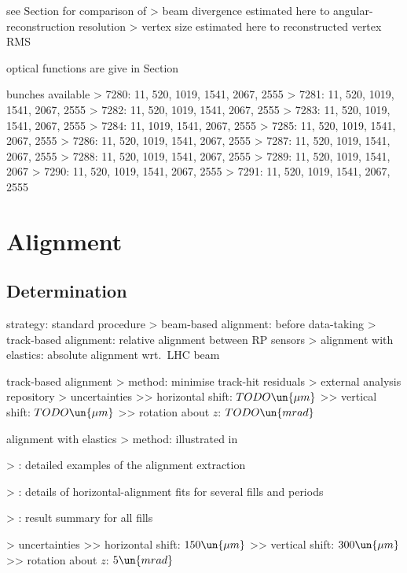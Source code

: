 \> see Section  for comparison of
\>> beam divergence estimated here to angular-reconstruction resolution
\>> vertex size estimated here to reconstructed vertex RMS

\> optical functions are give in Section 

\> bunches available
\>> 7280: 11, 520, 1019, 1541, 2067, 2555
\>> 7281: 11, 520, 1019, 1541, 2067, 2555
\>> 7282: 11, 520, 1019, 1541, 2067, 2555
\>> 7283: 11, 520, 1019, 1541, 2067, 2555
\>> 7284: 11, 1019, 1541, 2067, 2555
\>> 7285: 11, 520, 1019, 1541, 2067, 2555
\>> 7286: 11, 520, 1019, 1541, 2067, 2555
\>> 7287: 11, 520, 1019, 1541, 2067, 2555
\>> 7288: 11, 520, 1019, 1541, 2067, 2555
\>> 7289: 11, 520, 1019, 1541, 2067
\>> 7290: 11, 520, 1019, 1541, 2067, 2555
\>> 7291: 11, 520, 1019, 1541, 2067, 2555



\chapter[alignment]{Alignment}


\section[alignment-det]{Determination}

\> strategy: standard procedure
\>> beam-based alignment: before data-taking
\>> track-based alignment: relative alignment between RP sensors
\>> alignment with elastics: absolute alignment wrt.~LHC beam

\> track-based alignment
\>> method: minimise track-hit residuals
\>> external analysis repository
\>> uncertainties
\>>> horizontal shift: $TODO\un{\mu m}$
\>>> vertical shift: $TODO\un{\mu m}$
\>>> rotation about $z$: $TODO\un{mrad}$

\> alignment with elastics
\>> method: illustrated in 

\>> : detailed examples of the alignment extraction

\>> : details of horizontal-alignment fits for several fills and periods

\>> : result summary for all fills

\>> uncertainties
\>>> horizontal shift: $150\un{\mu m}$
\>>> vertical shift: $300\un{\mu m}$
\>>> rotation about $z$: $5\un{mrad}$

